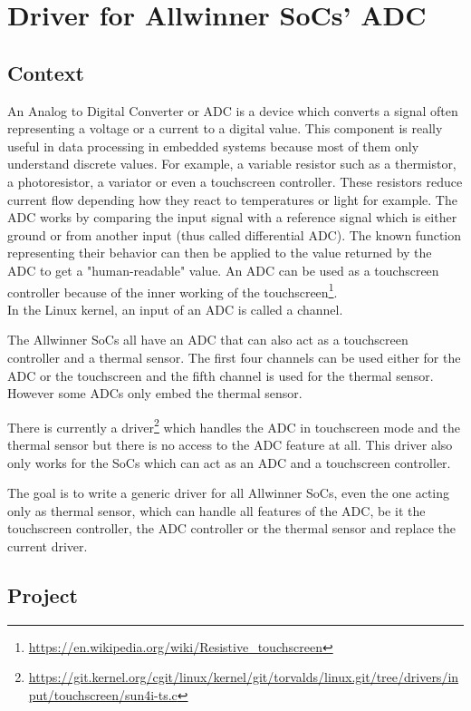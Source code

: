 \chapter{Driver for Allwinner SoCs' ADC}
\section{Context}

An Analog to Digital Converter or ADC is a device which converts a signal often representing a voltage or a current to a digital value. This component is really useful in data processing in embedded systems because most of them only understand discrete values. For example, a variable resistor such as a thermistor, a photoresistor, a variator or even a touchscreen controller. These resistors reduce current flow depending how they react to temperatures or light for example. The ADC works by comparing the input signal with a reference signal which is either ground or from another input (thus called differential ADC). The known function representing their behavior can then be applied to the value returned by the ADC to get a "human-readable" value. An ADC can be used as a touchscreen controller because of the inner working of the touchscreen\footnote{\url{https://en.wikipedia.org/wiki/Resistive\_touchscreen}}.\\
In the Linux kernel, an input of an ADC is called a channel.

The Allwinner SoCs all have an ADC that can also act as a touchscreen controller and a thermal sensor. The first four channels can be used either for the ADC or the touchscreen and the fifth channel is used for the thermal sensor. However some ADCs only embed the thermal sensor.

There is currently a driver\footnote{\url{https://git.kernel.org/cgit/linux/kernel/git/torvalds/linux.git/tree/drivers/input/touchscreen/sun4i-ts.c}} which handles the ADC in touchscreen mode and the thermal sensor but there is no access to the ADC feature at all. This driver also only works for the SoCs which can act as an ADC and a touchscreen controller.

The goal is to write a generic driver for all Allwinner SoCs, even the one acting only as thermal sensor, which can handle all features of the ADC, be it the touchscreen controller, the ADC controller or the thermal sensor and replace the current driver.

\section{Project}

